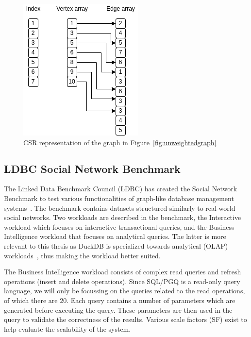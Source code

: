 \begin{figure}
  \includegraphics[width=0.6\linewidth]{figures/Unweighted CSR.drawio.png}
  \caption{CSR representation of the graph in Figure~\ref{fig:unweightedgraph}}
  \label{fig:csrunweightedgraph}
\end{figure}



\subsection{LDBC Social Network Benchmark}
The Linked Data Benchmark Council (LDBC) has created the Social Network Benchmark to test various functionalities of graph-like database management systems~\cite{DBLP:journals/corr/abs-2001-02299}. 
The benchmark contains datasets structured similarly to real-world social networks. 
Two workloads are described in the benchmark, the Interactive workload which focuses on interactive transactional queries, and the Business Intelligence workload that focuses on analytical queries. 
The latter is more relevant to this thesis as DuckDB is specialized towards analytical (OLAP) workloads~\cite{DBLP:conf/sigmod/RaasveldtM19}, thus making the workload better suited.

The Business Intelligence workload consists of complex read queries and refresh operations (insert and delete operations). Since SQL/PGQ is a read-only query language, we will only be focussing on the queries related to the read operations, of which there are 20. Each query contains a number of parameters which are generated before executing the query. These parameters are then used in the query to validate the correctness of the results. Various scale factors (SF) exist to help evaluate the scalability of the system.    

